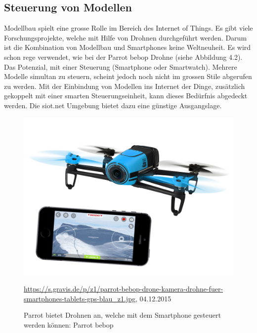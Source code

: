 \subsection{Steuerung von Modellen}
Modellbau spielt eine grosse Rolle im Bereich des Internet of Things. Es gibt viele Forschungsprojekte, welche mit Hilfe von Drohnen durchgeführt werden. Darum ist die Kombination von Modellbau und Smartphones keine Weltneuheit. Es wird schon rege verwendet, wie bei der Parrot bebop Drohne (siehe Abbildung 4.2). Das Potenzial, mit einer Steuerung (Smartphone oder Smartwatch). Mehrere Modelle simultan zu steuern, scheint jedoch noch nicht im grossen Stile abgerufen zu werden. Mit der Einbindung von Modellen ins Internet der Dinge, zusätzlich gekoppelt mit einer smarten Steuerungseinheit, kann dieses Bedürfnis abgedeckt werden. Die siot.net Umgebung bietet dazu eine günstige Ausgangslage.
\begin{figure}[h]
  \centering
  \includegraphics[scale=1]{98_Bilder/04_Anwendungen/parrotdrone}
  \caption[Smartphone gesteuerte Drohne: Parrot bebop]{Parrot bietet Drohnen an, welche mit dem Smartphone gesteuert werden können: Parrot bebop}
  \footnotesize \url{https://s.gravis.de/p/z1/parrot-bebop-drone-kamera-drohne-fuer-smartphones-tablets-gps-blau_z1.jpg}, 04.12.2015
\end{figure}
